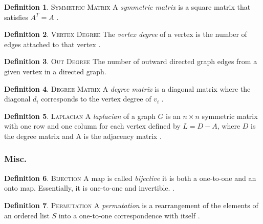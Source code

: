 \documentclass[11pt]{article}
\theoremstyle{definition}
\newtheorem{definition}{Definition}[section]
\begin{document}
	\theoremstyle{definition}
	\begin{definition}{\textsc{Symmetric Matrix}}
		A \emph{symmetric matrix} is a square matrix that satisfies $A^T = A$ \cite{mathworld:SymmetricMatrix}.
	\end{definition}
	
	\theoremstyle{definition}
	\begin{definition}{\textsc{Vertex Degree}}
		The \emph{vertex degree} of a vertex is the number of edges attached to that vertex \cite{mathworld:VertexDegree}.
	\end{definition}
	
	\theoremstyle{definition}
	\begin{definition}{\textsc{Out Degree}}
		The number of outward directed graph edges from a given vertex in a directed graph.
	\end{definition}
	
	\theoremstyle{definition}
	\begin{definition}{\textsc{Degree Matrix}}
		A \emph{degree matrix} is a diagonal matrix where the diagonal $d_i$ corresponds to the vertex degree of $v_i$ \cite{mathworld:DegreeMatrix}. 
	\end{definition}
	
	\theoremstyle{definition}
	\begin{definition}{\textsc{Laplacian}}
		A \emph{laplacian} of a graph $G$ is an $n \times n$ symmetric matrix with one row and one column for each vertex defined by $L = D - A$, where $D$ is the degree matrix and A is the adjacency matrix \cite{mathworld:Laplacian}.
	\end{definition}

\subsubsection{Misc.}
	\theoremstyle{definition}
	\begin{definition}{\textsc{Bijection}}
		A map is called \emph{bijective} it is both a one-to-one and an onto map. 
		Essentially, it is one-to-one and invertible. \cite{mathworld:Bijection}. 
	\end{definition}
	
	\theoremstyle{definition}
	\begin{definition}{\textsc{Permutation}}
		 A \emph{permutation} is a rearrangement of the elements of an ordered list $S$ into a one-to-one correspondence with itself \cite{mathworld:Permutation}.
	\end{definition}
	
\end{document}
